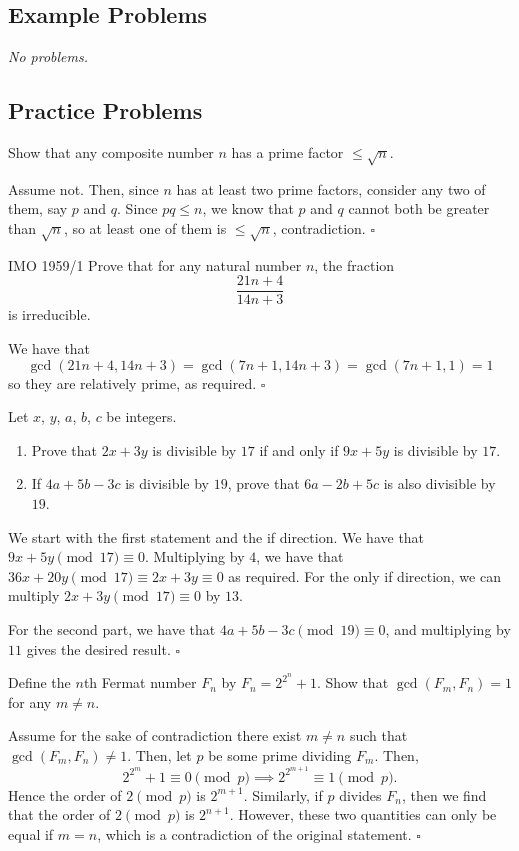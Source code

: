 \documentclass{article}
\newcommand{\noproblems}{\emph{No problems.}}
\begin{document}
\subsection{Example Problems}

\noproblems

\subsection{Practice Problems}

\begin{problem}[1.12.1]{}
Show that any composite number $n$ has a prime factor $\le \sqrt{n}$.
\end{problem}
Assume not. Then, since $n$ has at least two prime factors, consider any two of them, say $p$ and $q$. Since $pq \le n$, we know that $p$ and $q$ cannot both be greater than $\sqrt{n}$, so at least one of them is $\le \sqrt{n}$, contradiction. $\square$

\begin{problem}[1.12.2]{IMO 1959/1}
Prove that for any natural number $n$, the fraction \[\dfrac{21n + 4}{14n + 3}\] is irreducible.
\end{problem}
We have that \[\gcd(21n+4, 14n+3) = \gcd(7n+1, 14n+3) = \gcd(7n+1, 1) = 1\] so they are relatively prime, as required. $\square$

\begin{problem}[1.12.3]{}
Let $x$, $y$, $a$, $b$, $c$ be integers.
\begin{enumerate}
\item Prove that $2x + 3y$ is divisible by $17$ if and only if $9x + 5y$ is divisible by $17$.
\item If $4a + 5b - 3c$ is divisible by $19$, prove that $6a - 2b + 5c$ is also divisible by $19$.
\end{enumerate}
\end{problem}
We start with the first statement and the if direction. We have that $9x+5y \pmod{17} \equiv 0$. Multiplying by $4$, we have that $36x+20y \pmod{17} \equiv 2x + 3y \equiv 0$ as required. For the only if direction, we can multiply $2x+3y \pmod{17} \equiv 0$ by $13$. 

For the second part, we have that $4a+5b-3c \pmod{19} \equiv 0$, and multiplying by $11$ gives the desired result. $\square$

\begin{problem}[1.12.4]{}
Define the $n$th Fermat number $F_n$ by $F_n = 2^{2^n}+ 1$. Show that $\gcd(F_m, F_n) = 1$ for any $m \neq n$.
\end{problem}
Assume for the sake of contradiction there exist $m \neq n$ such that $\gcd(F_m, F_n) \neq 1$. Then, let $p$ be some prime dividing $F_m$. Then, \[2^{2^m}+1 \equiv 0 \pmod{p} \implies 2^{2^{m+1}} \equiv 1 \pmod{p}.\] Hence the order of $2 \pmod{p}$ is $2^{m+1}$. Similarly, if $p$ divides $F_n$, then we find that the order of $2 \pmod{p}$ is $2^{n+1}$. However, these two quantities can only be equal if $m = n$, which is a contradiction of the original statement. $\square$
\end{document}

